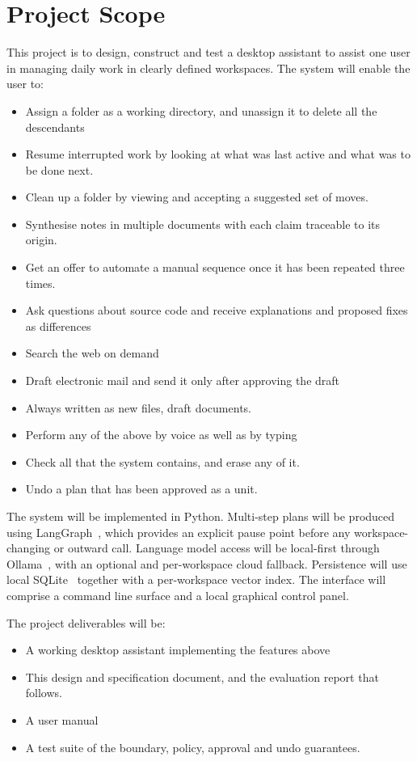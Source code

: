 \documentclass{FastFyp}
\begin{document}
\section{Project Scope}
This project is to design, construct and test a desktop assistant to assist one user in managing daily work in clearly defined workspaces. The system will enable the user to:

\begin{itemize}
    \item Assign a folder as a working directory, and unassign it to delete all the descendants
    \item Resume interrupted work by looking at what was last active and what was to be done next.
    \item Clean up a folder by viewing and accepting a suggested set of moves.
    \item Synthesise notes in multiple documents with each claim traceable to its origin.
    \item Get an offer to automate a manual sequence once it has been repeated three times.
    \item Ask questions about source code and receive explanations and proposed fixes as differences
    \item Search the web on demand
    \item Draft electronic mail and send it only after approving the draft
    \item Always written as new files, draft documents.
    \item Perform any of the above by voice as well as by typing
    \item Check all that the system contains, and erase any of it.
    \item Undo a plan that has been approved as a unit.
\end{itemize}

The system will be implemented in Python. Multi-step plans will be produced using LangGraph~\cite{ref:langgraph}, which provides an explicit pause point before any workspace-changing or outward call. Language model access will be local-first through Ollama~\cite{ref:ollama}, with an optional and per-workspace cloud fallback. Persistence will use local SQLite~\cite{ref:sqlite} together with a per-workspace vector index. The interface will comprise a command line surface and a local graphical control panel.

The project deliverables will be:

\begin{itemize}
    \item A working desktop assistant implementing the features above
    \item This design and specification document, and the evaluation report that follows.
    \item A user manual
    \item A test suite of the boundary, policy, approval and undo guarantees.
\end{itemize}
\end{document}
